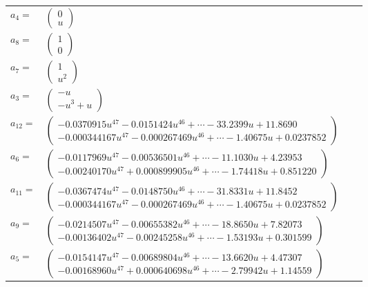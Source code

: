 \documentclass[1p]{elsarticle_modified}
\theoremstyle{definition}
\begin{document}
\begin{tabular}{m{7pt} m{180pt} m{7pt} m{180pt} }
\flushright $a_{4}=$&$\begin{pmatrix}0\\u\end{pmatrix}$ \\
\flushright $a_{8}=$&$\begin{pmatrix}1\\0\end{pmatrix}$ \\
\flushright $a_{7}=$&$\begin{pmatrix}1\\u^2\end{pmatrix}$ \\
\flushright $a_{3}=$&$\begin{pmatrix}- u\\- u^3+u\end{pmatrix}$ \\
\flushright $a_{12}=$&$\begin{pmatrix}-0.0370915 u^{47}-0.0151424 u^{46}+\cdots-33.2399 u+11.8690\\-0.000344167 u^{47}-0.000267469 u^{46}+\cdots-1.40675 u+0.0237852\end{pmatrix}$ \\
\flushright $a_{6}=$&$\begin{pmatrix}-0.0117969 u^{47}-0.00536501 u^{46}+\cdots-11.1030 u+4.23953\\-0.00240170 u^{47}+0.000899905 u^{46}+\cdots-1.74418 u+0.851220\end{pmatrix}$ \\
\flushright $a_{11}=$&$\begin{pmatrix}-0.0367474 u^{47}-0.0148750 u^{46}+\cdots-31.8331 u+11.8452\\-0.000344167 u^{47}-0.000267469 u^{46}+\cdots-1.40675 u+0.0237852\end{pmatrix}$ \\
\flushright $a_{9}=$&$\begin{pmatrix}-0.0214507 u^{47}-0.00655382 u^{46}+\cdots-18.8650 u+7.82073\\-0.00136402 u^{47}-0.00245258 u^{46}+\cdots-1.53193 u+0.301599\end{pmatrix}$ \\
\flushright $a_{5}=$&$\begin{pmatrix}-0.0154147 u^{47}-0.00689804 u^{46}+\cdots-13.6620 u+4.47307\\-0.00168960 u^{47}+0.000640698 u^{46}+\cdots-2.79942 u+1.14559\end{pmatrix}$ \\

\end{tabular}
\end{document}

